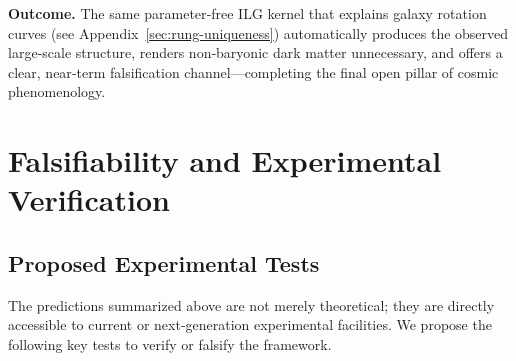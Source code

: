 \bigskip
\noindent
\textbf{Outcome.} The same parameter‑free ILG kernel that explains
galaxy rotation curves (see Appendix~\ref{sec:rung-uniqueness}) automatically produces the observed
large‑scale structure, renders non‑baryonic dark matter unnecessary, and
offers a clear, near‑term falsification channel—completing the final
open pillar of cosmic phenomenology.

\section{Falsifiability and Experimental Verification}

\subsection{Proposed Experimental Tests}
The predictions summarized above are not merely theoretical; they are directly accessible to current or next-generation experimental facilities. We propose the following key tests to verify or falsify the framework.

